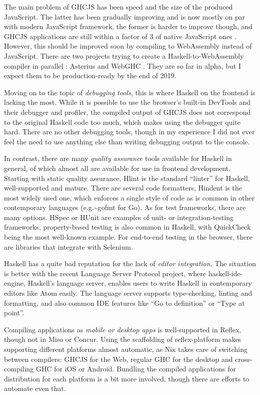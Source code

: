 \documentclass[english,odsaz]{fitthesis}
\begin{document}
The main problem of GHCJS has been speed and the size of the produced
JavaScript. The latter has been gradually improving and is now mostly on par
with modern JavaScript framework, the former is harder to improve though, and
GHCJS applications are still within a factor of 3 of native JavaScript ones
\cite{nanda_bench}. However, this should be improved soon by compiling to
WebAssembly instead of JavaScript. There are two projects trying to create a
Haskell-to-WebAssembly compiler in parallel : Asterius \cite{asterius} and WebGHC
\cite{webghc}. They are so far in alpha, but I expect them to be production-ready
by the end of 2019.

Moving on to the topic of \emph{debugging tools}, this is where Haskell on the frontend
is lacking the most. While it is possible to use the browser's built-in DevTools
and their debugger and profiler, the compiled output of GHCJS does not
correspond to the original Haskell code too much, which makes using the debugger
quite hard. There are no other debugging tools, though in my experience I did
not ever feel the need to use anything else than writing debugging output to the
console.

In contrast, there are many \emph{quality assurance} tools available for Haskell in
general, of which almost all are available for use in frontend
development. Starting with static quality assurance, Hlint is the standard
``linter'' for Haskell, well-supported and mature. There are several code
formatters, Hindent is the most widely used one, which enforces a single style
of code as is common in other contemporary languages (e.g.\textasciitilde{}gofmt for Go). As for
test frameworks, there are many options. HSpec or HUnit are examples of unit- or
integration-testing frameworks, property-based testing is also common in
Haskell, with QuickCheck \cite{claessen2011quickcheck} being the most well-known
example. For end-to-end testing in the browser, there are libraries that
integrate with Selenium.

Haskell has a quite bad reputation for the lack of \emph{editor integration}. The
situation is better with the recent Language Server Protocol project, where
haskell-ide-engine, Haskell's language server, enables users to write Haskell in
contemporary editors like Atom easily. The language server supports
type-checking, linting and formatting, and also common IDE features like
``Go to definition'' or ``Type at point''.

Compiling applications as \emph{mobile or desktop apps} is well-supported in Reflex,
though not in Miso or Concur. Using the scaffolding of reflex-platform makes
supporting different platforms almost automatic, as Nix takes care of switching
between compilers: GHCJS for the Web, regular GHC for the desktop and
cross-compiling GHC for iOS or Android. Bundling the compiled applications for
distribution for each platform is a bit more involved, though there are efforts
to automate even that.
\end{document}
